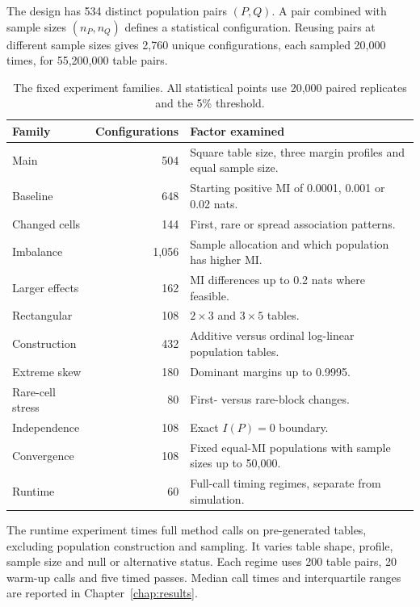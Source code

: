 The design has 534 distinct population pairs \((P,Q)\). A pair combined
with sample sizes \((n_P,n_Q)\) defines a statistical configuration.
Reusing pairs at different sample sizes gives 2,760 unique configurations,
each sampled 20,000 times, for 55,200,000 table pairs.

\begin{table}[H]
\centering
\caption{The fixed experiment families. All statistical points use 20,000
paired replicates and the 5\% threshold.}
\label{tab:design-families}
\begin{tabularx}{\textwidth}{@{}lrX@{}}
\toprule
Family & Configurations & Factor examined\\
\midrule
Main & 504 & Square table size, three margin profiles and equal sample size.\\
Baseline & 648 & Starting positive MI of 0.0001, 0.001 or 0.02 nats.\\
Changed cells & 144 & First, rare or spread association patterns.\\
Imbalance & 1,056 & Sample allocation and which population has higher MI.\\
Larger effects & 162 & MI differences up to 0.2 nats where feasible.\\
Rectangular & 108 & \(2\times3\) and \(3\times5\) tables.\\
Construction & 432 & Additive versus ordinal log-linear population tables.\\
Extreme skew & 180 & Dominant margins up to 0.9995.\\
Rare-cell stress & 80 & First- versus rare-block changes.\\
Independence & 108 & Exact \(I(P)=0\) boundary.\\
Convergence & 108 & Fixed equal-MI populations with sample sizes up to 50,000.\\
Runtime & 60 & Full-call timing regimes, separate from simulation.\\
\bottomrule
\end{tabularx}
\end{table}

The runtime experiment times full method calls on pre-generated tables,
excluding population construction and sampling. It varies table shape,
profile, sample size and null or alternative status. Each regime uses 200
table pairs, 20 warm-up calls and five timed passes. Median call times and
interquartile ranges are reported in Chapter~\ref{chap:results}.
